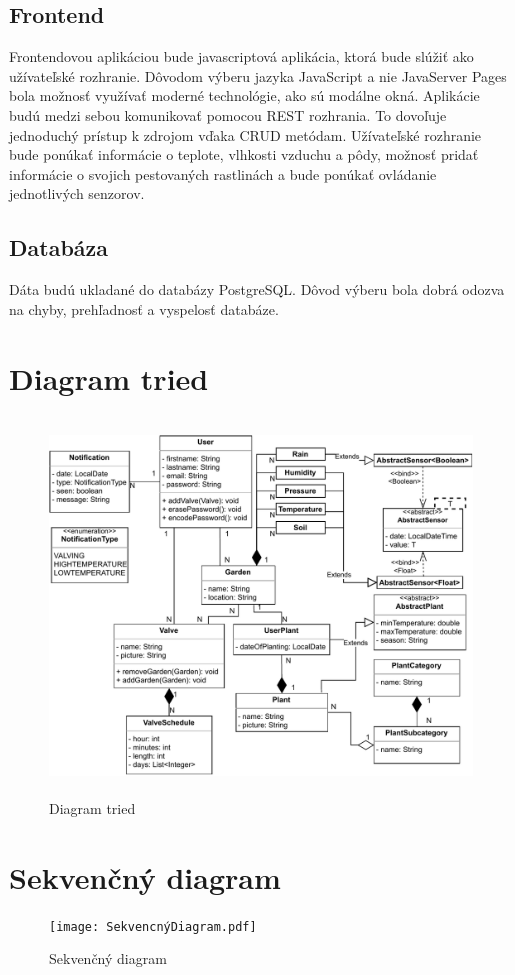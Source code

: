\documentclass[twoside]{ctuthesis}
\theoremstyle{plain}
\theoremstyle{definition}
\theoremstyle{note}
\begin{document}
\subsection{Frontend}
Frontendovou aplikáciou bude javascriptová aplikácia, ktorá bude slúžiť ako užívateľské rozhranie. Dôvodom výberu jazyka JavaScript a nie JavaServer Pages bola možnosť využívať moderné technológie, ako sú modálne okná.  Aplikácie budú medzi sebou komunikovať pomocou REST rozhrania. To dovoľuje jednoduchý prístup k zdrojom vďaka CRUD metódam. Užívateľské rozhranie bude ponúkať informácie o teplote, vlhkosti vzduchu a pôdy, možnosť pridať informácie o svojich pestovaných rastlinách a bude ponúkať ovládanie jednotlivých senzorov.

\subsection{Databáza}
Dáta budú ukladané do databázy PostgreSQL. Dôvod výberu bola dobrá odozva na chyby, prehľadnosť a vyspelosť databáze.

\section{Diagram tried}
\begin{figure}[H]
\includegraphics[width= 13 cm, height = 10cm]{ClassDiagram.pdf}
\caption{Diagram tried}
\label{fig:classDiagram}
\end{figure}

\section{Sekvenčný diagram}
\begin{figure}[H]
\texttt{[image: SekvencnýDiagram.pdf]}
\caption{Sekvenčný diagram}
\label{fig:sequenceDiagram}
\end{figure}
\end{document}
